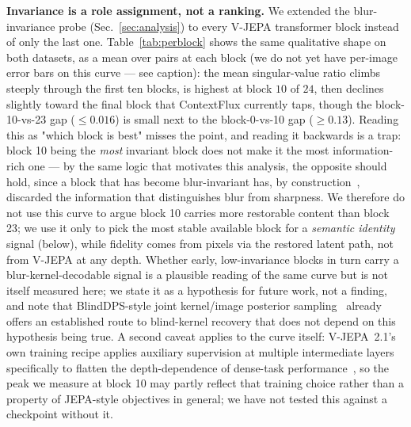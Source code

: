 \documentclass{article}
\begin{document}
\textbf{Invariance is a role assignment, not a ranking.} We extended the blur-invariance probe (Sec.~\ref{sec:analysis}) to every V-JEPA transformer block instead of only the last one. Table~\ref{tab:perblock} shows the same qualitative shape on both datasets, as a mean over pairs at each block (we do not yet have per-image error bars on this curve — see caption): the mean singular-value ratio climbs steeply through the first ten blocks, is highest at block $10$ of $24$, then declines slightly toward the final block that ContextFlux currently taps, though the block-10-vs-23 gap ($\le 0.016$) is small next to the block-0-vs-10 gap ($\ge 0.13$). Reading this as "which block is best" misses the point, and reading it backwards is a trap: block 10 being the \emph{most} invariant block does not make it the most information-rich one — by the same logic that motivates this analysis, the opposite should hold, since a block that has become blur-invariant has, by construction~\cite{achille2018invariance}, discarded the information that distinguishes blur from sharpness. We therefore do not use this curve to argue block 10 carries more restorable content than block 23; we use it only to pick the most stable available block for a \emph{semantic identity} signal (below), while fidelity comes from pixels via the restored latent path, not from V-JEPA at any depth. Whether early, low-invariance blocks in turn carry a blur-kernel-decodable signal is a plausible reading of the same curve but is not itself measured here; we state it as a hypothesis for future work, not a finding, and note that BlindDPS-style joint kernel/image posterior sampling~\cite{blinddps2022,blindpnpdm2025} already offers an established route to blind-kernel recovery that does not depend on this hypothesis being true. A second caveat applies to the curve itself: V-JEPA~2.1's own training recipe applies auxiliary supervision at multiple intermediate layers specifically to flatten the depth-dependence of dense-task performance~\cite{vjepa21_2026}, so the peak we measure at block 10 may partly reflect that training choice rather than a property of JEPA-style objectives in general; we have not tested this against a checkpoint without it.
\end{document}
